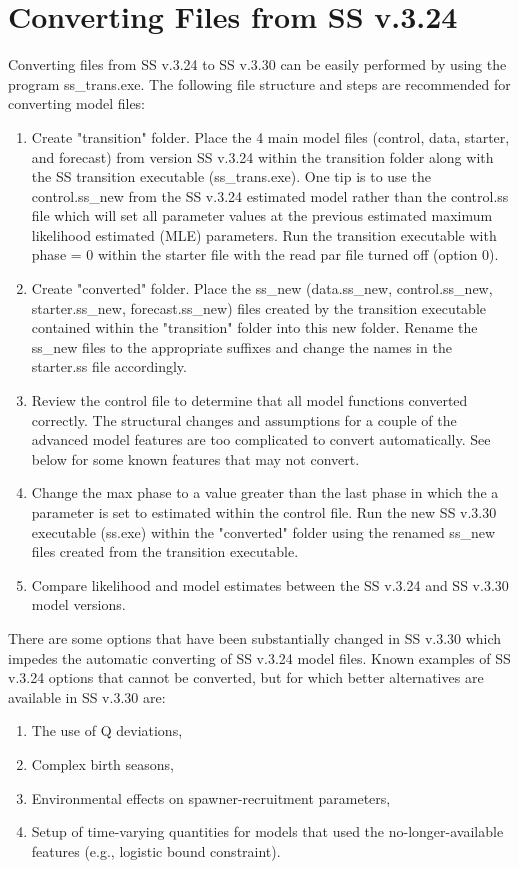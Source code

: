 \hypertarget{ConvIssues}{}
\section{Converting Files from SS v.3.24}
Converting files from SS v.3.24 to SS v.3.30 can be easily performed by using the program ss\_trans.exe. The following file structure and steps are recommended for converting model files:
\begin{enumerate}
	\item Create "transition" folder.  Place the 4 main model files (control, data, starter, and forecast) from version SS v.3.24 within the transition folder along with the SS transition executable (ss\_trans.exe).  One tip is to use the control.ss\_new from the SS v.3.24 estimated model rather than the control.ss file which will set all parameter values at the previous estimated maximum likelihood estimated (MLE) parameters.  Run the transition executable with phase = 0 within the starter file with the read par file turned off (option 0).
	\item Create "converted" folder.  Place the ss\_new (data.ss\_new, control.ss\_new, starter.ss\_new, forecast.ss\_new) files created by the transition executable contained within the "transition" folder into this new folder.  Rename the ss\_new files to the appropriate suffixes and change the names in the starter.ss file accordingly.
	\item Review the control file to determine that all model functions converted correctly.  The structural changes and assumptions for a couple of the advanced model features are too complicated to convert automatically.  See below for some known features that may not convert.
	\item Change the max phase to a value greater than the last phase in which the a parameter is set to estimated within the control file.  Run the new SS v.3.30 executable (ss.exe) within the "converted" folder using the renamed ss\_new files created from the transition executable.
	\item Compare likelihood and model estimates between the SS v.3.24 and SS v.3.30 model versions.
\end{enumerate}

\noindent There are some options that have been substantially changed in SS v.3.30 which impedes the automatic converting of SS v.3.24 model files. Known examples of SS v.3.24 options that cannot be converted, but for which better alternatives are available in SS v.3.30 are:
\begin{enumerate}
	\item The use of Q deviations,
	\item Complex birth seasons,
	\item Environmental effects on spawner-recruitment parameters,
	\item Setup of time-varying quantities for models that used the no-longer-available features (e.g., logistic bound constraint).
\end{enumerate}
